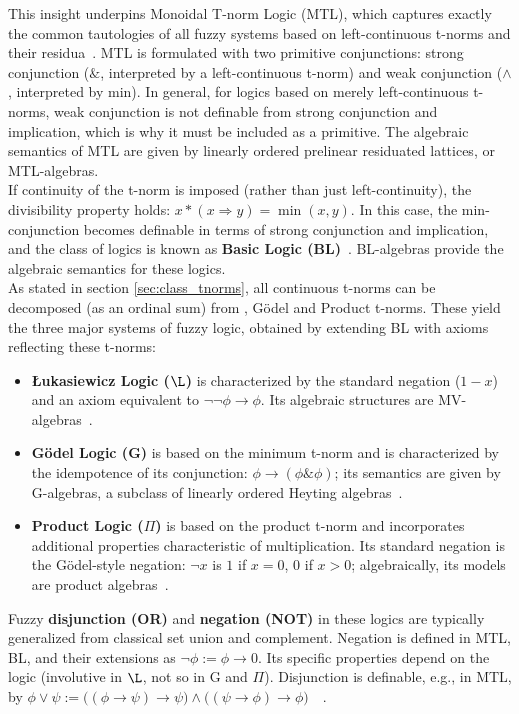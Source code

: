 This insight underpins Monoidal T-norm Logic (MTL), which captures exactly the common tautologies of all fuzzy systems based on left-continuous t-norms and their residua~\cite{GodoMonoidal}. MTL is formulated with two primitive conjunctions: strong conjunction ($\&$, interpreted by a left-continuous t-norm) and weak conjunction ($\wedge$, interpreted by min). In general, for logics based on merely left-continuous t-norms, weak conjunction is not definable from strong conjunction and implication, which is why it must be included as a primitive. The algebraic semantics of MTL are given by linearly ordered prelinear residuated lattices, or MTL-algebras.\\

If continuity of the t-norm is imposed (rather than just left-continuity), the divisibility property holds: $x * (x \Rightarrow y) = \min(x, y)$. In this case, the min-conjunction becomes definable in terms of strong conjunction and implication, and the class of logics is known as \textbf{Basic Logic (BL)}~\cite[Sec. 2.2]{Hajek1998}. BL-algebras provide the algebraic semantics for these logics.\\

As stated in section \ref{sec:class_tnorms}, all continuous t-norms can be decomposed (as an ordinal sum) from \luka, Gödel and Product t-norms. These yield the three major systems of fuzzy logic, obtained by extending BL with axioms reflecting these t-norms:
\begin{itemize}
    \item \textbf{Łukasiewicz Logic ($\L$)} is characterized by the standard negation ($1-x$) and an axiom equivalent to $\lnot\lnot\phi \rightarrow \phi$. Its algebraic structures are MV-algebras~\cite[Ch. 3]{Hajek1998}.
    \item \textbf{Gödel Logic (G)} is based on the minimum t-norm and is characterized by the idempotence of its conjunction: $\phi \rightarrow (\phi \& \phi)$; its semantics are given by G-algebras, a subclass of linearly ordered Heyting algebras~\cite[Sec. 4.2]{Hajek1998}.
    \item \textbf{Product Logic ($\Pi$)} is based on the product t-norm and incorporates additional properties characteristic of multiplication. Its standard negation is the Gödel-style negation: $\lnot x$ is $1$ if $x=0$, $0$ if $x>0$; algebraically, its models are product algebras~\cite[Sec. 4.1]{Hajek1998}.
\end{itemize}

Fuzzy \textbf{disjunction (OR)} and \textbf{negation (NOT)} in these logics are typically generalized from classical set union and complement. Negation is defined in MTL, BL, and their extensions as $\lnot \phi := \phi \rightarrow 0$. Its specific properties depend on the logic (involutive in $\L$, not so in G and $\Pi$). Disjunction is definable, e.g., in MTL, by $\phi \vee \psi := \big((\phi \rightarrow \psi) \rightarrow \psi\big) \wedge \big((\psi \rightarrow \phi) \rightarrow \phi\big)$~\cite[Def. 1]{GodoMonoidal}~\cite[Def. 2.2.1]{Hajek1998}. 

